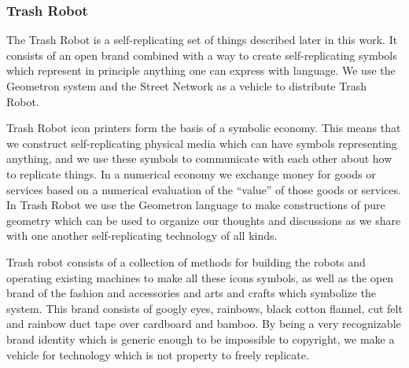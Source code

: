 \documentclass{report}
\begin{document}
\hypertarget{trash-robot}{%
\subsubsection{Trash Robot}\label{trash-robot}}

The Trash Robot is a self-replicating set of things described later in
this work. It consists of an open brand combined with a way to create
self-replicating symbols which represent in principle anything one can
express with language. We use the Geometron system and the Street
Network as a vehicle to distribute Trash Robot.

Trash Robot icon printers form the basis of a symbolic economy. This
means that we construct self-replicating physical media which can have
symbols representing anything, and we use these symbols to communicate
with each other about how to replicate things. In a numerical economy we
exchange money for goods or services based on a numerical evaluation of
the ``value'' of those goods or services. In Trash Robot we use the
Geometron language to make constructions of pure geometry which can be
used to organize our thoughts and discussions as we share with one
another self-replicating technology of all kinds.

Trash robot consists of a collection of methods for building the robots
and operating existing machines to make all these icons symbols, as well
as the open brand of the fashion and accessories and arts and crafts
which symbolize the system. This brand consists of googly eyes,
rainbows, black cotton flannel, cut felt and rainbow duct tape over
cardboard and bamboo. By being a very recognizable brand identity which
is generic enough to be impossible to copyright, we make a vehicle for
technology which is not property to freely replicate.
\end{document}
